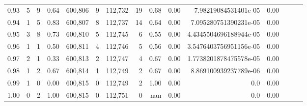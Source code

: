 \begin{tabular}{rrrrrrrrrrrrrrr}
0.93 &       5 &      9 &  0.64 &  600,806 &        9 &  112,732 &       19 &  0.68 &  0.00 &    7.98219084531401e-05 &      0.00 \\
0.94 &       1 &      5 &  0.83 &  600,807 &        8 &  112,737 &       14 &  0.64 &  0.00 &   7.095280751390231e-05 &      0.00 \\
0.95 &       3 &      8 &  0.73 &  600,810 &        5 &  112,745 &        6 &  0.55 &  0.00 &  4.4345504696188944e-05 &      0.00 \\
0.96 &       1 &      1 &  0.50 &  600,811 &        4 &  112,746 &        5 &  0.56 &  0.00 &  3.5476403756951156e-05 &      0.00 \\
0.97 &       2 &      1 &  0.33 &  600,813 &        2 &  112,747 &        4 &  0.67 &  0.00 &  1.7738201878475578e-05 &      0.00 \\
0.98 &       1 &      2 &  0.67 &  600,814 &        1 &  112,749 &        2 &  0.67 &  0.00 &   8.869100939237789e-06 &      0.00 \\
0.99 &       1 &      0 &  0.00 &  600,815 &        0 &  112,749 &        2 &  1.00 &  0.00 &                     0.0 &      0.00 \\
1.00 &       0 &      2 &  1.00 &  600,815 &        0 &  112,751 &        0 &   nan &  0.00 &                     0.0 &      0.00 \\
\bottomrule
\end{tabular}
